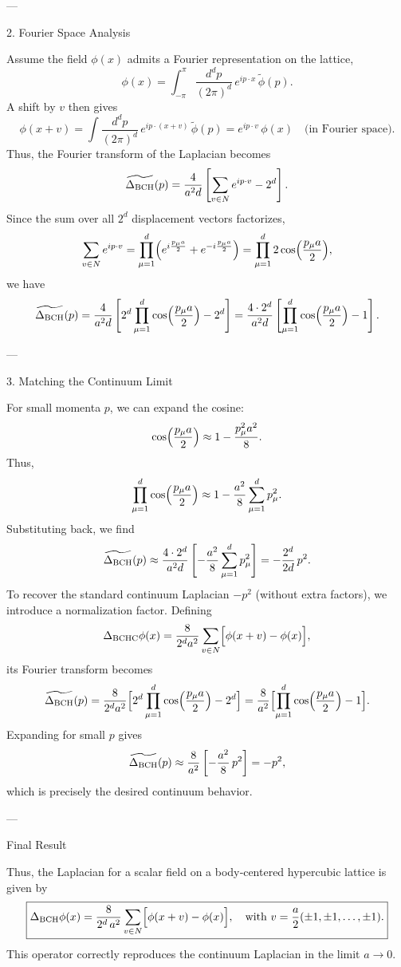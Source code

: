 {---

2. Fourier Space Analysis

Assume the field \(\phi(x)\) admits a Fourier representation on the lattice,
\[
\phi(x) = \int_{-\pi}^{\pi} \frac{d^d p}{(2\pi)^d}\, e^{i p\cdot x}\, \tilde{\phi}(p).
\]
A shift by \(v\) then gives
\[
\phi(x+v) = \int \frac{d^d p}{(2\pi)^d}\, e^{i p\cdot (x+v)}\, \tilde{\phi}(p) = e^{ip\cdot v}\,\phi(x) \quad \text{(in Fourier space)}.
\]
Thus, the Fourier transform of the Laplacian becomes
\[
\widetilde{\Delta_{\rm BCH}}(p) = \frac{4}{a^2 d}\left[\sum_{v\in N}e^{i p\cdot v} - 2^d\right].
\]
Since the sum over all \(2^d\) displacement vectors factorizes,
\[
\sum_{v\in N}e^{i p\cdot v} = \prod_{\mu=1}^{d}\Bigl(e^{i\frac{p_\mu a}{2}}+e^{-i\frac{p_\mu a}{2}}\Bigr) = \prod_{\mu=1}^{d}2\cos\Bigl(\frac{p_\mu a}{2}\Bigr),
\]
we have
\[
\widetilde{\Delta_{\rm BCH}}(p) = \frac{4}{a^2 d}\left[2^d\prod_{\mu=1}^{d}\cos\Bigl(\frac{p_\mu a}{2}\Bigr)- 2^d\right] 
= \frac{4\cdot 2^d}{a^2 d}\left[\prod_{\mu=1}^{d}\cos\Bigl(\frac{p_\mu a}{2}\Bigr)- 1\right].
\]

---

3. Matching the Continuum Limit

For small momenta \(p\), we can expand the cosine:
\[
\cos\Bigl(\frac{p_\mu a}{2}\Bigr) \approx 1 - \frac{p_\mu^2 a^2}{8}.
\]
Thus,
\[
\prod_{\mu=1}^{d}\cos\Bigl(\frac{p_\mu a}{2}\Bigr) \approx 1 - \frac{a^2}{8}\sum_{\mu=1}^{d}p_\mu^2.
\]
Substituting back, we find
\[
\widetilde{\Delta_{\rm BCH}}(p) \approx \frac{4\cdot 2^d}{a^2 d}\left[- \frac{a^2}{8}\sum_{\mu=1}^{d}p_\mu^2\right] = - \frac{2^d}{2d}\, p^2.
\]
To recover the standard continuum Laplacian \(-p^2\) (without extra factors), we introduce a normalization factor. Defining
\[
\Delta_{\rm BCHC}\phi(x) = \frac{8}{2^d a^2}\sum_{v\in N}\Bigl[\phi(x+v)-\phi(x)\Bigr],
\]
its Fourier transform becomes
\[
\widetilde{\Delta_{\rm BCH}}(p) = \frac{8}{2^d a^2}\Bigl[2^d\prod_{\mu=1}^{d}\cos\Bigl(\frac{p_\mu a}{2}\Bigr)-2^d\Bigr] = \frac{8}{a^2}\Bigl[\prod_{\mu=1}^{d}\cos\Bigl(\frac{p_\mu a}{2}\Bigr)-1\Bigr].
\]
Expanding for small \(p\) gives
\[
\widetilde{\Delta_{\rm BCH}}(p) \approx \frac{8}{a^2}\left[-\frac{a^2}{8}\,p^2\right] = -p^2,
\]
which is precisely the desired continuum behavior.

---

 Final Result

Thus, the Laplacian for a scalar field on a body‐centered hypercubic lattice is given by
\[
\boxed{
\Delta_{\rm BCH}\phi(x) = \frac{8}{2^d\,a^2}\sum_{v\in N}\Bigl[\phi(x+v)-\phi(x)\Bigr],\quad \text{with } v=\frac{a}{2}(\pm 1,\pm 1,\dots,\pm 1).
}
\]
This operator correctly reproduces the continuum Laplacian in the limit \(a\to 0\).

}

